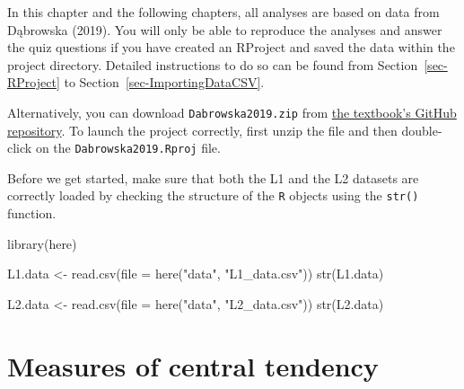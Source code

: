 \documentclass[
  letterpaper,
  DIV=11,
  numbers=noendperiod]{scrreprt}
\newenvironment{Shaded}{\begin{snugshade}}{\end{snugshade}}
\newcommand{\AttributeTok}[1]{\textcolor[rgb]{0.40,0.45,0.13}{#1}}
\newcommand{\FunctionTok}[1]{\textcolor[rgb]{0.28,0.35,0.67}{#1}}
\newcommand{\NormalTok}[1]{\textcolor[rgb]{0.00,0.23,0.31}{#1}}
\newcommand{\OtherTok}[1]{\textcolor[rgb]{0.00,0.23,0.31}{#1}}
\newcommand{\StringTok}[1]{\textcolor[rgb]{0.13,0.47,0.30}{#1}}
\begin{document}
\begin{tcolorbox}[enhanced jigsaw, arc=.35mm, bottomrule=.15mm, bottomtitle=1mm, breakable, colback=white, colbacktitle=quarto-callout-warning-color!10!white, colframe=quarto-callout-warning-color-frame, coltitle=black, left=2mm, leftrule=.75mm, opacityback=0, opacitybacktitle=0.6, rightrule=.15mm, title=\textcolor{quarto-callout-warning-color}{\faExclamationTriangle}\hspace{0.5em}{Prerequisites}, titlerule=0mm, toprule=.15mm, toptitle=1mm]

In this chapter and the following chapters, all analyses are based on
data from Dąbrowska (2019). You will only be able to reproduce the
analyses and answer the quiz questions if you have created an RProject
and saved the data within the project directory. Detailed instructions
to do so can be found from Section~\ref{sec-RProject} to
Section~\ref{sec-ImportingDataCSV}.

Alternatively, you can download \texttt{Dabrowska2019.zip} from
\href{https://github.com/elenlefoll/RstatsTextbook/raw/69d1e31be7394f2b612825f031ebffeb75886390/Dabrowska2019.zip}{the
textbook's GitHub repository}. To launch the project correctly, first
unzip the file and then double-click on the \texttt{Dabrowska2019.Rproj}
file.

Before we get started, make sure that both the L1 and the L2 datasets
are correctly loaded by checking the structure of the \texttt{R} objects
using the \texttt{str()} function.

\begin{Shaded}
\begin{Highlighting}[]
\FunctionTok{library}\NormalTok{(here)}

\NormalTok{L1.data }\OtherTok{\textless{}{-}} \FunctionTok{read.csv}\NormalTok{(}\AttributeTok{file =} \FunctionTok{here}\NormalTok{(}\StringTok{"data"}\NormalTok{, }\StringTok{"L1\_data.csv"}\NormalTok{))}
\FunctionTok{str}\NormalTok{(L1.data)}

\NormalTok{L2.data }\OtherTok{\textless{}{-}} \FunctionTok{read.csv}\NormalTok{(}\AttributeTok{file =} \FunctionTok{here}\NormalTok{(}\StringTok{"data"}\NormalTok{, }\StringTok{"L2\_data.csv"}\NormalTok{))}
\FunctionTok{str}\NormalTok{(L2.data)}
\end{Highlighting}
\end{Shaded}

\end{tcolorbox}

\section{Measures of central tendency}\label{sec-CentralTendency}
\end{document}
